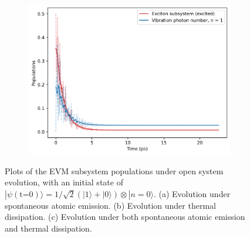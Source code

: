 \documentclass[11pt]{article}
\begin{document}
\begin{figure}[H]
    \vspace{0.5cm}
    
    \begin{subfigure}{0.45\textwidth}
        \centering
        \includegraphics[width=\linewidth]{Research Project/Code/results/ExVib/Open/Population/pops_ex_both_eg.png}
        \caption{}
        \label{fig:EVM_OQS_Pop_both_eg}
    \end{subfigure}
    \hfill

    \caption{Plots of the EVM subsystem populations under open system evolution, with an initial state of $|\psi (\text{t=0})\rangle = 1/\sqrt{2}(|1\rangle + |0\rangle)\otimes|n=0\rangle$. (a) Evolution under spontaneous atomic emission. (b) Evolution under thermal dissipation. (c) Evolution under both spontaneous atomic emission and thermal dissipation.}
    \label{fig:EVM_OQS_Pop_eg}
\end{figure}
\end{document}
